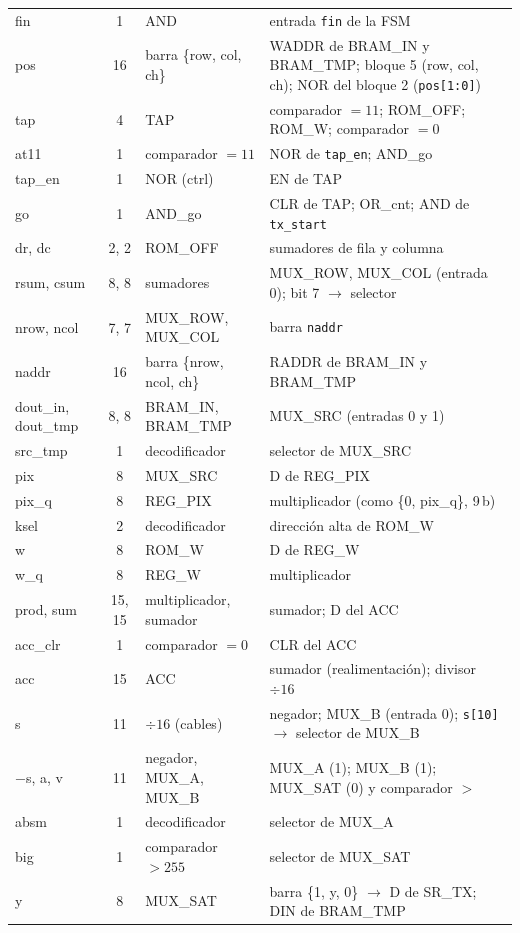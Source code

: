 \documentclass[11pt,a4paper]{article}
\begin{document}
{\begin{longtable}{>{\ttfamily}l c >{\raggedright\arraybackslash}p{3.6cm} >{\raggedright\arraybackslash}p{6.45cm}}
fin & 1 & AND & entrada \texttt{fin} de la FSM \\
pos & 16 & barra \{row, col, ch\} & WADDR de BRAM\_IN y BRAM\_TMP; bloque 5 (row, col, ch); NOR del bloque 2 (\texttt{pos[1:0]}) \\
tap & 4 & TAP & comparador $= 11$; ROM\_OFF; ROM\_W; comparador $= 0$ \\
at11 & 1 & comparador $= 11$ & NOR de \texttt{tap\_en}; AND\_go \\
tap\_en & 1 & NOR (ctrl) & EN de TAP \\
go & 1 & AND\_go & CLR de TAP; OR\_cnt; AND de \texttt{tx\_start} \\
dr, dc & 2, 2 & ROM\_OFF & sumadores de fila y columna \\
rsum, csum & 8, 8 & sumadores & MUX\_ROW, MUX\_COL (entrada 0); bit 7 $\to$ selector \\
nrow, ncol & 7, 7 & MUX\_ROW, MUX\_COL & barra \texttt{naddr} \\
naddr & 16 & barra \{nrow, ncol, ch\} & RADDR de BRAM\_IN y BRAM\_TMP \\
dout\_in, dout\_tmp & 8, 8 & BRAM\_IN, BRAM\_TMP & MUX\_SRC (entradas 0 y 1) \\
src\_tmp & 1 & decodificador & selector de MUX\_SRC \\
pix & 8 & MUX\_SRC & D de REG\_PIX \\
pix\_q & 8 & REG\_PIX & multiplicador (como \{0, pix\_q\}, 9\,b) \\
ksel & 2 & decodificador & dirección alta de ROM\_W \\
w & 8 & ROM\_W & D de REG\_W \\
w\_q & 8 & REG\_W & multiplicador \\
prod, sum & 15, 15 & multiplicador, sumador & sumador; D del ACC \\
acc\_clr & 1 & comparador $= 0$ & CLR del ACC \\
acc & 15 & ACC & sumador (realimentación); divisor $\div16$ \\
s & 11 & $\div16$ (cables) & negador; MUX\_B (entrada 0); \texttt{s[10]} $\to$ selector de MUX\_B \\
$-$s, a, v & 11 & negador, MUX\_A, MUX\_B & MUX\_A (1); MUX\_B (1); MUX\_SAT (0) y comparador $>$ \\
absm & 1 & decodificador & selector de MUX\_A \\
big & 1 & comparador $> 255$ & selector de MUX\_SAT \\
y & 8 & MUX\_SAT & barra \{1, y, 0\} $\to$ D de SR\_TX; DIN de BRAM\_TMP \\

\end{longtable}}
\end{document}
